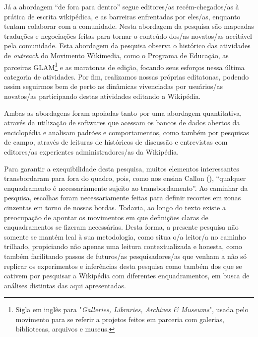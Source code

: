 Já a abordagem ``de fora para dentro'' segue editores/as recém-chegados/as à prática de escrita wikipédica, e as barreiras enfrentadas por eles/as, enquanto tentam colaborar com a comunidade. Nesta abordagem da pesquisa são mapeadas traduções e negociações feitas para tornar o conteúdo dos/as novatos/as aceitável pela comunidade. Esta abordagem da pesquisa observa o histórico das atividades de \textit{outreach} do Movimento Wikimedia, como o Programa de Educação, as parceiras GLAM\footnote{Sigla em inglês para "\textit{Galleries, Libraries, Archives \& Museums}", usada pelo movimento para se referir a projetos feitos em parceria com galerias, bibliotecas, arquivos e museus.} e as maratonas de edição, focando seus esforços nessa última categoria de atividades. Por fim, realizamos nossas próprias editatonas, podendo assim seguirmos bem de perto as dinâmicas vivenciadas por usuários/as novatos/as participando destas atividades editando a Wikipédia.

Ambas as abordagens foram apoiadas tanto por uma abordagem quantitativa, através da utilização de softwares que acessam os bancos de dados abertos da enciclopédia e analisam padrões e comportamentos, como também por pesquisas de campo, através de leituras de históricos de discussão e entrevistas com editores/as experientes administradores/as da Wikipédia.

Para garantir a exequibilidade desta pesquisa, muitos elementos interessantes transbordaram para fora do quadro, pois, como nos ensina Callon (\citeyear[18]{callon_markets_1998}), ``qualquer enquadramento é necessariamente sujeito ao transbordamento''. Ao caminhar da pesquisa, escolhas foram necessariamente feitas para definir recortes em zonas cinzentas em torno de nossas bordas. Todavia, ao longo do texto existe a preocupação de apontar os movimentos em que definições claras de enquadramentos se fizeram necessárias. Desta forma, a presente pesquisa não somente se mantém leal à sua metodologia, como situa o/a leitor/a no caminho trilhado, propiciando não apenas uma leitura contextualizada e honesta, como também facilitando passos de futuros/as pesquisadores/as que venham a não só replicar os experimentos e inferências desta pesquisa como também dos que se cativem por pesquisar a Wikipédia com diferentes enquadramentos, em busca de análises distintas das aqui apresentadas.


